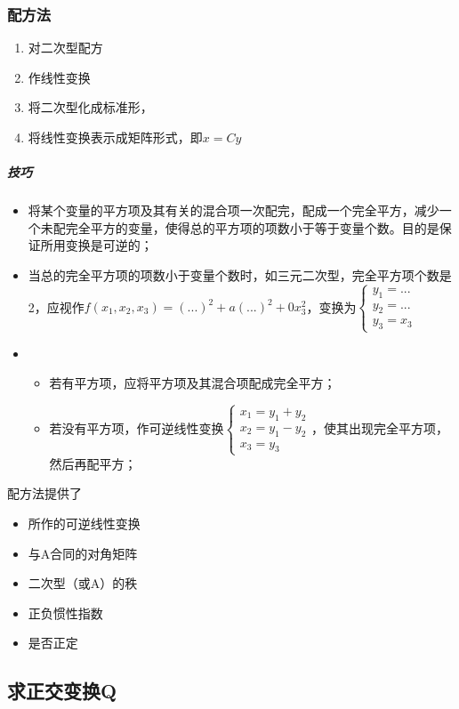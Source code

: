 \subsubsection{配方法}
\begin{enumerate}
    \item 对二次型配方
    \item 作线性变换
    \item 将二次型化成标准形，
    \item 将线性变换表示成矩阵形式，即\(x = Cy\)
\end{enumerate}

\subparagraph{技巧}
\begin{itemize}
    \item 将某个变量的平方项及其有关的混合项一次配完，配成一个完全平方，减少一个未配完全平方的变量，使得总的平方项的项数小于等于变量个数。目的是保证所用变换是可逆的；
    \item 当总的完全平方项的项数小于变量个数时，如三元二次型，完全平方项个数是2，应视作\(f(x_1, x_2, x_3) = (...)^2 + a(...)^2 + 0x_3^2\)，变换为\(\begin{cases}
        y_1 = ... \\ 
        y_2 = ... \\ 
        y_3 = x_3
    \end{cases}\)
    \item \begin{itemize}
        \item 若有平方项，应将平方项及其混合项配成完全平方；
        \item 若没有平方项，作可逆线性变换\(\begin{cases}
            x_1 = y_1 + y_2 \\ 
            x_2 = y_1 - y_2 \\ 
            x_3 = y_3
        \end{cases}\)，使其出现完全平方项，然后再配平方；
    \end{itemize}
\end{itemize}

配方法提供了\begin{itemize}
    \item 所作的可逆线性变换
    \item 与A合同的对角矩阵
    \item 二次型（或A）的秩
    \item 正负惯性指数
    \item 是否正定
\end{itemize}


\subsection{求正交变换Q}

